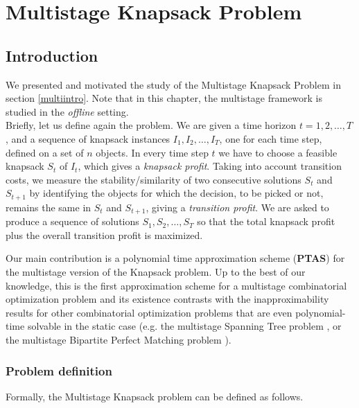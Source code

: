 \documentclass[a4paper]{book}
\begin{document}
\chapter{Multistage Knapsack Problem}

\section{Introduction}
We presented and motivated the study of the Multistage Knapsack Problem in section \ref{multiintro}. Note that in this chapter, the multistage framework is studied in the \textit{offline} setting.\\

Briefly, let us define again the problem. We are 
given a time horizon $t=1,2,\ldots,T$, and a sequence of knapsack instances $I_1,I_2,\ldots,I_T$, one for each time step, defined on a set of $n$ objects. In every time step $t$ we have to choose a feasible knapsack $S_t$ of $I_t$, which gives a \emph{knapsack profit}. Taking into account transition costs, we measure the stability/similarity of two  consecutive solutions  $S_t$ and $S_{t+1}$ by identifying the objects for which the decision, to be picked or not, remains the same in $S_t$ and $S_{t+1}$, giving a \emph{transition profit}. We are asked to produce a sequence of solutions $S_1,S_2,\ldots,S_T$  so that the total knapsack profit plus the overall transition profit is maximized.

Our main contribution is a polynomial time approximation scheme (\textbf{PTAS}) for the multistage  version of the {\sc Knapsack} problem. Up to the best of our knowledge, this is the first approximation scheme for a multistage combinatorial optimization problem and its existence contrasts with the inapproximability results for other combinatorial optimization problems that are even polynomial-time solvable in the static case (e.g. the {\sc multistage  Spanning Tree} problem \cite{Gupta}, or the {\sc multistage  Bipartite Perfect Matching} problem \cite{Bampis}).

\subsection{Problem definition}
Formally, the {\sc Multistage  Knapsack} problem can be defined as follows.
\end{document}
